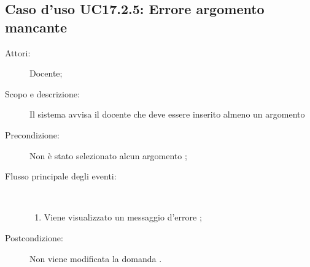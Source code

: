 \subsection{Caso d'uso UC17.2.5: Errore argomento mancante}\begin{description}
	\item[Attori:] Docente;
	\item[Scopo e descrizione:] Il sistema avvisa il docente che deve essere inserito almeno un argomento
	
	\item[Precondizione:] Non è stato selezionato alcun argomento
	;
	
	\item[Flusso principale degli eventi:] \ 
	\begin{enumerate}
		\item Viene visualizzato un messaggio d'errore	;
		
	\end{enumerate}
	\item[Postcondizione:] Non viene modificata la domanda
	.
\end{description}
\hypertarget{UC17.3}{}
